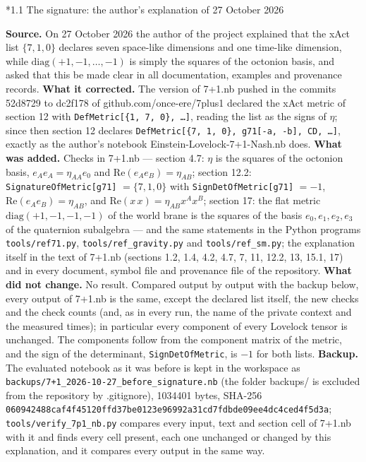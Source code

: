 \documentclass[10pt,a4paper]{article}
\makeatletter
\renewcommand\subsection{\@startsection{subsection}{2}{\z@}{-3.25ex\@plus -1ex \@minus -.2ex}{1.5ex \@plus .2ex}{\normalfont\large\bfseries\raggedright}}
\makeatother
\begin{document}
\subsection*{1.1 The signature: the author’s explanation of 27 October 2026}
\textbf{Source.} On 27 October 2026 the author of the project explained that the xAct list $\{7,1,0\}$ declares seven space-like dimensions and one time-like dimension, while $\mathrm{diag}(+1,-1,\dots,-1)$ is simply the squares of the octonion basis, and asked that this be made clear in all documentation, examples and provenance records. \textbf{What it corrected.} The version of 7+1.nb pushed in the commits 52d8729 to dc2f178 of github.com/once-ere/7plus1 declared the xAct metric of section 12 with \texttt{DefMetric[\{1, 7, 0\}, …]}, reading the list as the signs of $\eta$; since then section 12 declares \texttt{DefMetric[\{7, 1, 0\}, g71[-a, -b], CD, …]}, exactly as the author’s notebook Einstein-Lovelock-7+1-Nash.nb does. \textbf{What was added.} Checks in 7+1.nb — section 4.7: $\eta$ is the squares of the octonion basis, $e_Ae_A=\eta_{AA}e_0$ and $\mathrm{Re}(e_Ae_B)=\eta_{AB}$; section 12.2: \texttt{SignatureOfMetric[g71]} $=\{7,1,0\}$ with \texttt{SignDetOfMetric[g71]} $=-1$, $\mathrm{Re}(e_Ae_B)=\eta_{AB}$, and $\mathrm{Re}(x\,x)=\eta_{AB}x^Ax^B$; section 17: the flat metric $\mathrm{diag}(+1,-1,-1,-1)$ of the world brane is the squares of the basis $e_0,e_1,e_2,e_3$ of the quaternion subalgebra — and the same statements in the Python programs \texttt{tools/\allowbreak{}ref71.py}, \texttt{tools/\allowbreak{}ref\_\allowbreak{}gravity.py} and \texttt{tools/\allowbreak{}ref\_\allowbreak{}sm.py}; the explanation itself in the text of 7+1.nb (sections 1.2, 1.4, 4.2, 4.7, 7, 11, 12.2, 13, 15.1, 17) and in every document, symbol file and provenance file of the repository. \textbf{What did not change.} No result. Compared output by output with the backup below, every output of 7+1.nb is the same, except the declared list itself, the new checks and the check counts (and, as in every run, the name of the private context and the measured times); in particular every component of every Lovelock tensor is unchanged. The components follow from the component matrix of the metric, and the sign of the determinant, \texttt{SignDetOfMetric}, is $-1$ for both lists. \textbf{Backup.} The evaluated notebook as it was before is kept in the workspace as \texttt{backups/\allowbreak{}7+1\_\allowbreak{}2026-10-27\_\allowbreak{}before\_\allowbreak{}signature.nb} (the folder backups/ is excluded from the repository by .gitignore), 1034401 bytes, SHA-256 \texttt{06094248\allowbreak{}8caf4f45\allowbreak{}120ffd37\allowbreak{}be0123e9\allowbreak{}6992a31c\allowbreak{}d7fdbde0\allowbreak{}9ee4dc4c\allowbreak{}ed4f5d3a}; \texttt{tools/\allowbreak{}verify\_\allowbreak{}7p1\_\allowbreak{}nb.py} compares every input, text and section cell of 7+1.nb with it and finds every cell present, each one unchanged or changed by this explanation, and it compares every output in the same way.
\end{document}
